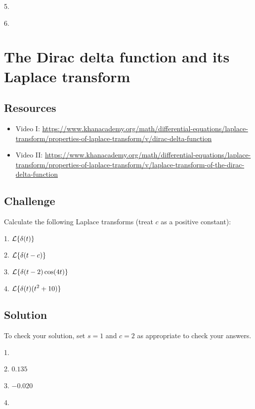 5.\\

6.\\



\newpage
\section{The Dirac delta function and its Laplace transform}

\subsection*{Resources}
\begin{itemize}
    \item Video I: \url{https://www.khanacademy.org/math/differential-equations/laplace-transform/properties-of-laplace-transform/v/dirac-delta-function}
    \item Video II: \url{https://www.khanacademy.org/math/differential-equations/laplace-transform/properties-of-laplace-transform/v/laplace-transform-of-the-dirac-delta-function}
\end{itemize}

\subsection*{Challenge}
Calculate the following Laplace transforms (treat $c$ as a positive constant):

1. $\displaystyle \mathcal{L}\{\delta(t)\}$

2. $\displaystyle \mathcal{L}\{\delta(t-c)\}$

3. $\displaystyle \mathcal{L}\{\delta(t-2) \cos(4 t)\}$

4. $\displaystyle \mathcal{L}\{\delta(t) (t^2+10)\}$

\subsection*{Solution}
To check your solution, set $s=1$ and $c=2$ as appropriate to check your answers. %

1.\\

2. $0.135$

3. $-0.020$

4.\\




